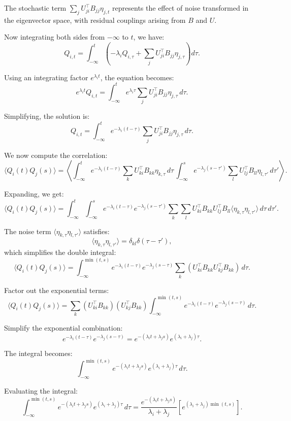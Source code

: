 \documentclass[English, Lau, oneside]{sapthesis}
\begin{document}
The stochastic term \(\sum_j U_{ji}^\top B_{jj} \eta_{j,t}\) represents the effect of noise transformed in the eigenvector space, with residual couplings arising from \(B\) and \(U\).

Now integrating both sides from \(-\infty\) to \(t\), we have:
\[
Q_{i,t} = \int_{-\infty}^t \left( -\lambda_i Q_{i,\tau} + \sum_j U_{ji}^\top B_{jj} \eta_{j,\tau} \right) d\tau.
\]

Using an integrating factor \(e^{\lambda_i t}\), the equation becomes:
\[
e^{\lambda_i t} Q_{i,t} = \int_{-\infty}^t e^{\lambda_i \tau} \sum_j U_{ji}^\top B_{jj} \eta_{j,\tau} \, d\tau.
\]

Simplifying, the solution is:
\[
Q_{i,t} = \int_{-\infty}^t e^{-\lambda_i (t - \tau)} \sum_j U_{ji}^\top B_{jj} \eta_{j,\tau} \, d\tau.
\]

We now compute the correlation:
\[
\langle Q_i(t) Q_j(s) \rangle = \left\langle \int_{-\infty}^t e^{-\lambda_i (t - \tau)} \sum_k U_{ki}^\top B_{kk} \eta_{k,\tau} \, d\tau \, \int_{-\infty}^s e^{-\lambda_j (s - \tau')} \sum_l U_{lj}^\top B_{ll} \eta_{l,\tau'} \, d\tau' \right\rangle.
\]

Expanding, we get:
\[
\langle Q_i(t) Q_j(s) \rangle = \int_{-\infty}^t \int_{-\infty}^s e^{-\lambda_i (t - \tau)} e^{-\lambda_j (s - \tau')} \sum_k \sum_l U_{ki}^\top B_{kk} U_{lj}^\top B_{ll} \langle \eta_{k,\tau} \eta_{l,\tau'} \rangle \, d\tau \, d\tau'.
\]

The noise term \(\langle \eta_{k,\tau} \eta_{l,\tau'} \rangle\) satisfies:
\[
\langle \eta_{k,\tau} \eta_{l,\tau'} \rangle = \delta_{kl} \delta(\tau - \tau'),
\]
which simplifies the double integral:
\[
\langle Q_i(t) Q_j(s) \rangle = \int_{-\infty}^{\min(t,s)} e^{-\lambda_i (t - \tau)} e^{-\lambda_j (s - \tau)} \sum_k (U_{ki}^\top B_{kk} U_{kj}^\top B_{kk}) \, d\tau.
\]

Factor out the exponential terms:
\[
\langle Q_i(t) Q_j(s) \rangle = \sum_k (U_{ki}^\top B_{kk}) (U_{kj}^\top B_{kk}) \int_{-\infty}^{\min(t,s)} e^{-\lambda_i (t - \tau)} e^{-\lambda_j (s - \tau)} \, d\tau.
\]

Simplify the exponential combination:
\[
e^{-\lambda_i (t - \tau)} e^{-\lambda_j (s - \tau)} = e^{-(\lambda_i t + \lambda_j s)} e^{(\lambda_i + \lambda_j) \tau}.
\]

The integral becomes:
\[
\int_{-\infty}^{\min(t,s)} e^{-(\lambda_i t + \lambda_j s)} e^{(\lambda_i + \lambda_j) \tau} \, d\tau.
\]

Evaluating the integral:
\[
\int_{-\infty}^{\min(t,s)} e^{-(\lambda_i t + \lambda_j s)} e^{(\lambda_i + \lambda_j) \tau} \, d\tau = \frac{e^{-(\lambda_i t + \lambda_j s)}}{\lambda_i + \lambda_j} \left[ e^{(\lambda_i + \lambda_j) \min(t,s)} \right].
\]
\end{document}
